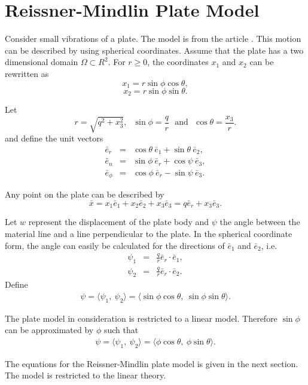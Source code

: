 \documentclass[../../main.tex]{subfiles}
\begin{document}
	\section{Reissner-Mindlin Plate Model} \label{sec:P_Model}
	Consider small vibrations of a plate. The model is from the article \cite{LVV09Plate}. This motion can be described by using spherical coordinates. Assume that the plate has a two dimensional domain $\Omega \subset R^2$. For $r \geq 0$, the coordinates $x_1$ and $x_2$ can be rewritten as
	\[ x_1 = r \sin \phi \cos \theta, \]
	\[ x_2 = r \sin \phi \sin \theta. \]
	
	Let
	\[ r = \sqrt{q^2 + x_3^2},~~~\sin \phi = \frac{q}{r}~~~\textrm{and}~~~\cos \theta = \frac{x_3}{r}.\]
	and define the unit vectors
	\begin{eqnarray*}
		\bar e_r &=& \cos \theta ~\bar e_1 + \sin \theta ~\bar e_2,\\
		\bar e_n &=& \sin \phi~\bar e_r + \cos \psi~\bar e_3, \\
		\bar e_\phi &=& \cos \phi~\bar e_r - \sin \psi~\bar e_3.
	\end{eqnarray*}
	
	Any point on the plate can be described by
	\[ \bar{x} = x_1 \bar e_1 + x_2 \bar e_2 + x_3 \bar e_3 = q \bar e_r + x_3 \bar e_3. \] \label{sym:en}
	
	
	Let $w$ represent the displacement of the plate body and $\psi$ the angle between the material line and a line perpendicular to the plate. In the spherical coordinate form, the angle can easily be calculated for the directions of $\bar{e}_1$ and $\bar{e}_2$, i.e.
	\begin{eqnarray*}
		\psi_1 & = & \frac{q}{r} \bar{e}_r \cdot \bar{e}_1, \\
		\psi_2 & = & \frac{q}{r} \bar{e}_r \cdot \bar{e}_2.
	\end{eqnarray*}
	Define
	\begin{eqnarray*}
		{\psi} = \langle \psi_1, \ \psi_2\rangle = \langle \sin\phi \cos \theta, \ \sin\phi \sin \theta\rangle.
	\end{eqnarray*}
	
	The plate model in consideration is restricted to a linear model. Therefore $\sin\phi$ can be approximated by $\phi$ such that
	\begin{eqnarray*}
		{\psi} = \langle \psi_1, \  \psi_2\rangle = \langle \phi \cos \theta, \ \phi \sin \theta \rangle.
	\end{eqnarray*}
	
	The equations for the Reissner-Mindlin plate model is given in the next section. The model is restricted to the linear theory.
	
\end{document}
